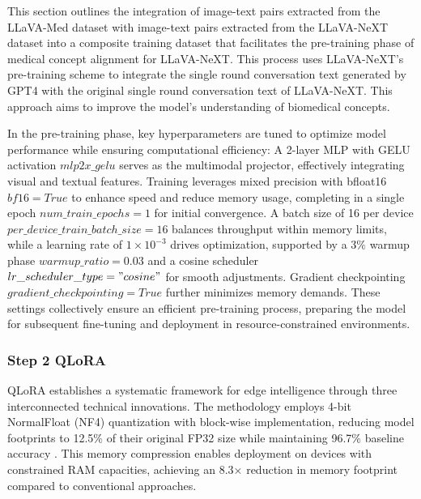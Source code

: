 \documentclass[10pt,letterpaper]{article}
\begin{document}
This section outlines the integration of image-text pairs extracted from the LLaVA-Med dataset with image-text pairs extracted from the LLaVA-NeXT dataset into a composite training dataset that facilitates the pre-training phase of medical concept alignment for LLaVA-NeXT. This process uses LLaVA-NeXT's pre-training scheme to integrate the single round conversation text generated by GPT4 with the original single round conversation text of LLaVA-NeXT. This approach aims to improve the model's understanding of biomedical concepts.

In the pre-training phase, key hyperparameters are tuned to optimize model performance while ensuring computational efficiency: A 2-layer MLP with GELU activation \(mlp2x\_gelu\) serves as the multimodal projector, effectively integrating visual and textual features. Training leverages mixed precision with bfloat16 \(bf16=True\) to enhance speed and reduce memory usage, completing in a single epoch \(num\_train\_epochs=1\) for initial convergence. A batch size of 16 per device \(per\_device\_train\_batch\_size=16\) balances throughput within memory limits, while a learning rate of \(1\times10^{-3}\) drives optimization, supported by a \(3\%\) warmup phase \(warmup\_ratio=0.03\) and a cosine scheduler \(lr\_scheduler\_type="cosine"\) for smooth adjustments. Gradient checkpointing \(gradient\_checkpointing=True\) further minimizes memory demands. These settings collectively ensure an efficient pre-training process, preparing the model for subsequent fine-tuning and deployment in resource-constrained environments.


\subsubsection*{Step 2 QLoRA}

QLoRA establishes a systematic framework for edge intelligence through three interconnected technical innovations. The methodology employs 4-bit NormalFloat (NF4) quantization with block-wise implementation, reducing model footprints to 12.5\% of their original FP32 size while maintaining 96.7\% baseline accuracy \cite{dettmers2023qlora}. This memory compression enables deployment on devices with constrained RAM capacities, achieving an 8.3× reduction in memory footprint compared to conventional approaches.
\end{document}
